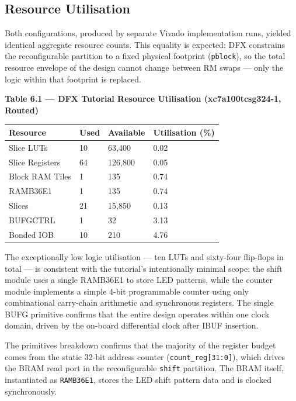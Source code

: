 \subsection{Resource Utilisation}

Both configurations, produced by separate Vivado implementation runs, yielded identical aggregate resource counts. This equality is expected: DFX constrains the reconfigurable partition to a fixed physical footprint (\texttt{pblock}), so the total resource envelope of the design cannot change between RM swaps — only the logic within that footprint is replaced.

\textbf{Table 6.1 — DFX Tutorial Resource Utilisation (xc7a100tcsg324-1, Routed)}

\begin{table}[htbp]
\centering
\begin{tabularx}{\textwidth}{X X X X}
\toprule
Resource & Used & Available & Utilisation (\%) \\
\midrule
Slice LUTs & 10 & 63,400 & 0.02 \\
Slice Registers & 64 & 126,800 & 0.05 \\
Block RAM Tiles & 1 & 135 & 0.74 \\
RAMB36E1 & 1 & 135 & 0.74 \\
Slices & 21 & 15,850 & 0.13 \\
BUFGCTRL & 1 & 32 & 3.13 \\
Bonded IOB & 10 & 210 & 4.76 \\
\bottomrule
\end{tabularx}
\end{table}

The exceptionally low logic utilisation — ten LUTs and sixty-four flip-flops in total — is consistent with the tutorial's intentionally minimal scope: the shift module uses a single RAMB36E1 to store LED patterns, while the counter module implements a simple 4-bit programmable counter using only combinational carry-chain arithmetic and synchronous registers. The single BUFG primitive confirms that the entire design operates within one clock domain, driven by the on-board differential clock after IBUF insertion.

The primitives breakdown confirms that the majority of the register budget comes from the static 32-bit address counter (\texttt{count\_reg[31:0]}), which drives the BRAM read port in the reconfigurable \texttt{shift} partition. The BRAM itself, instantiated as \texttt{RAMB36E1}, stores the LED shift pattern data and is clocked synchronously.

